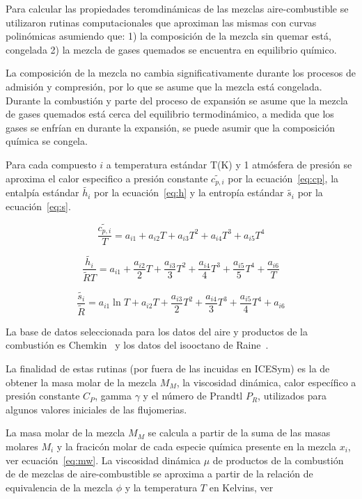 Para calcular las propiedades teromdinámicas de las mezclas aire-combustible se
utilizaron rutinas computacionales que aproximan las mismas con curvas
polinómicas asumiendo que: 1) la composición de la mezcla sin quemar está,
congelada 2) la mezcla de gases quemados se encuentra en equilibrio químico.

La composición de la mezcla no cambia significativamente durante los procesos de
admisión y compresión, por lo que se asume que la mezcla está congelada.
%
Durante la combustión y parte del proceso de expansión se asume que la mezcla de
gases quemados está cerca del equilibrio termodinámico, a medida que los gases
se enfrían en durante la expansión, se puede asumir que la composición química
se congela.

Para cada compuesto $i$ a temperatura estándar T(K) y 1 atmósfera de presión se
aproxima el calor especifico a presión constante $\widetilde{c_{p,i}}$ por la
ecuación~\ref{eq:cp}, la entalpía estándar $\widetilde{h_{i}}$ por la
ecuación~\ref{eq:h} y la entropía estándar $\widetilde{s_{i}}$ por la
ecuación~\ref{eq:s}.

\begin{equation}\label{eq:cp} \frac{\widetilde{c_{p,i}}}{T} = a_{i1} + a_{i2}T + a_{i3}T^{2} + a_{i4}T^{3} + a_{i5}T^{4}
\end{equation}

\begin{equation}\label{eq:h} \frac{\widetilde{h_{i}}}{\widetilde{R}T} = a_{i1} + \frac{a_{i2}}{2}T + \frac{a_{i3}}{3}T^{2} + \frac{a_{i4}}{4}T^{3} + \frac{a_{i5}}{5}T^{4} +\frac{a_{i6}}{T}
\end{equation}


\begin{equation}\label{eq:s} \frac{\widetilde{s_{i}}}{\widetilde{R}} = a_{i1} \ln{T} + a_{i2}T + \frac{a_{i3}}{2}T^{2} + \frac{a_{i4}}{3}T^{3} + \frac{a_{i5}}{4}T^{4} + a_{i6}
\end{equation}

La base de datos seleccionada para los datos del aire y productos de la
combustión es Chemkin~\parencite{chemkin} y los datos del isooctano de
Raine~\parencite{raine}.

La finalidad de estas rutinas (por fuera de las incuidas en ICESym) es la de
obtener la masa molar de la mezcla $M_{M}$, la viscosidad dinámica, calor
específico a presión constante $C_{P}$, gamma $\gamma$ y el número de Prandtl
$P_{R}$, utilizados para algunos valores iniciales de las flujomerias.

La masa molar de la mezcla $M_{M}$ se calcula a partir de la suma de las masas
molares $M_{i}$ y la fracicón molar de cada especie química presente en la
mezcla $x_{i}$, ver ecuación~\ref{eq:mw}.
%
La viscosidad dinámica $\mu$ de productos de la combustión de de mezclas de aire-combustible se
aproxima a partir de la relación de equivalencia
de la mezcla $\phi$ y la temperatura $T$ en Kelvins, ver

